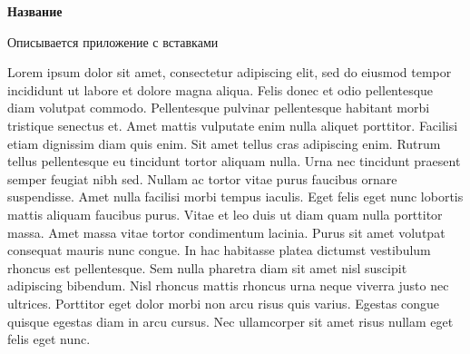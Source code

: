  \hypertarget{app-a}{\label{app-a}}

\textbf{Название}
\vspace{\baselineskip}

Описывается приложение с вставками

Lorem ipsum dolor sit amet, consectetur adipiscing elit, sed do eiusmod tempor incididunt ut 
labore et dolore magna aliqua. Felis donec et odio pellentesque diam volutpat commodo. 
Pellentesque pulvinar pellentesque habitant morbi tristique senectus et. Amet mattis vulputate
enim nulla aliquet porttitor. Facilisi etiam dignissim diam quis enim. Sit amet tellus cras 
adipiscing enim. Rutrum tellus pellentesque eu tincidunt tortor aliquam nulla. Urna nec tincidunt 
praesent semper feugiat nibh sed. Nullam ac tortor vitae purus faucibus ornare suspendisse. 
Amet nulla facilisi morbi tempus iaculis. Eget felis eget nunc lobortis mattis aliquam faucibus 
purus. Vitae et leo duis ut diam quam nulla porttitor massa. Amet massa vitae tortor condimentum 
lacinia. Purus sit amet volutpat consequat mauris nunc congue. In hac habitasse platea dictumst 
vestibulum rhoncus est pellentesque. Sem nulla pharetra diam sit amet nisl suscipit adipiscing 
bibendum. Nisl rhoncus mattis rhoncus urna neque viverra justo nec ultrices. Porttitor eget dolor 
morbi non arcu risus quis varius. Egestas congue quisque egestas diam in arcu cursus. Nec 
ullamcorper sit amet risus nullam eget felis eget nunc.

\clearpage